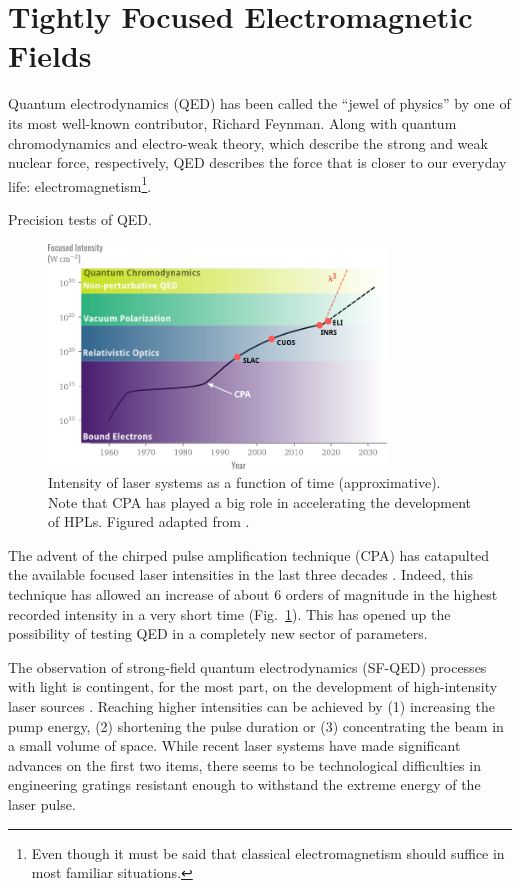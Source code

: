 \documentclass[11pt,SymmetricalJury]{inrsthesis/inrsthesis}
\begin{document}
\section{Tightly Focused Electromagnetic Fields}

Quantum electrodynamics (QED) has been called the ``jewel of physics'' by one
of its most well-known contributor, Richard Feynman. Along with quantum
chromodynamics and electro-weak theory, which describe the strong and
weak nuclear force, respectively, QED describes the force that is closer
to our everyday life: electromagnetism\footnote{Even though it must be
said that classical electromagnetism should suffice in most
familiar situations.}.

Precision tests of QED.

\begin{figure}
  \centering
  \includegraphics[width=0.8\textwidth]{figs/IntensityHistory.pdf}
  \caption[Short history of the intensity of laser systems.]
          {Intensity of laser systems as a function of time (approximative).
           Note that CPA has played a big role in accelerating the development
           of HPLs.
           Figured adapted from \cite{Mourou2015}.}
  \label{fig:intro.intensity-history}
\end{figure}

The advent of the chirped pulse amplification technique (CPA) has catapulted
the available focused laser intensities in the last three decades
\cite{Mourou2006}. Indeed, this technique has allowed an increase of about
6 orders of magnitude in the highest recorded intensity in a very short time
(Fig.~\ref{fig:intro.intensity-history}). This has opened up the possibility
of testing QED in a completely new sector of parameters.

The observation of strong-field quantum electrodynamics (SF-QED) processes with light
is contingent, for the most part, on the development of high-intensity laser sources \cite{DiPiazza2012}.
Reaching higher intensities can be achieved by (1) increasing the pump energy,
(2) shortening the pulse duration or (3) concentrating the beam in a small volume of space.
While recent laser systems have made significant advances on the first two items, there seems
to be technological difficulties in engineering gratings resistant enough to withstand the extreme
energy of the laser pulse.
\end{document}
